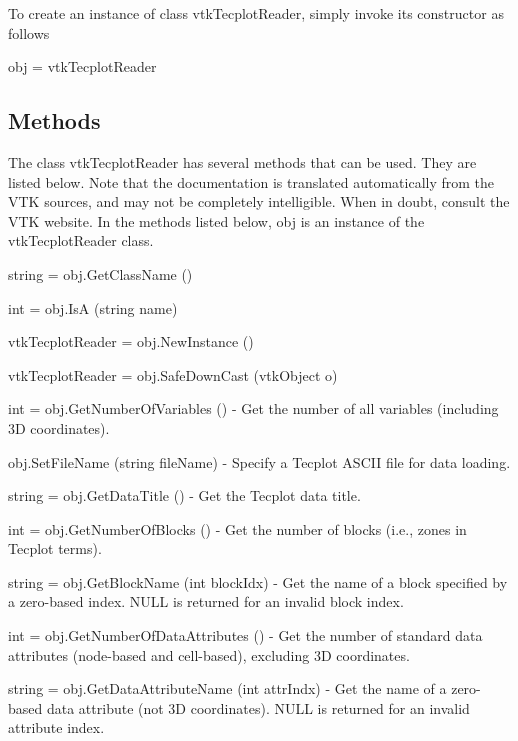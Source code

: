 To create an instance of class vtk\-Tecplot\-Reader, simply invoke its constructor as follows \begin{DoxyVerb}  obj = vtkTecplotReader
\end{DoxyVerb}
 \hypertarget{vtkwidgets_vtkxyplotwidget_Methods}{}\subsection{Methods}\label{vtkwidgets_vtkxyplotwidget_Methods}
The class vtk\-Tecplot\-Reader has several methods that can be used. They are listed below. Note that the documentation is translated automatically from the V\-T\-K sources, and may not be completely intelligible. When in doubt, consult the V\-T\-K website. In the methods listed below, {\ttfamily obj} is an instance of the vtk\-Tecplot\-Reader class. 
\begin{DoxyItemize}
\item {\ttfamily string = obj.\-Get\-Class\-Name ()}  
\item {\ttfamily int = obj.\-Is\-A (string name)}  
\item {\ttfamily vtk\-Tecplot\-Reader = obj.\-New\-Instance ()}  
\item {\ttfamily vtk\-Tecplot\-Reader = obj.\-Safe\-Down\-Cast (vtk\-Object o)}  
\item {\ttfamily int = obj.\-Get\-Number\-Of\-Variables ()} -\/ Get the number of all variables (including 3\-D coordinates).  
\item {\ttfamily obj.\-Set\-File\-Name (string file\-Name)} -\/ Specify a Tecplot A\-S\-C\-I\-I file for data loading.  
\item {\ttfamily string = obj.\-Get\-Data\-Title ()} -\/ Get the Tecplot data title.  
\item {\ttfamily int = obj.\-Get\-Number\-Of\-Blocks ()} -\/ Get the number of blocks (i.\-e., zones in Tecplot terms).  
\item {\ttfamily string = obj.\-Get\-Block\-Name (int block\-Idx)} -\/ Get the name of a block specified by a zero-\/based index. N\-U\-L\-L is returned for an invalid block index.  
\item {\ttfamily int = obj.\-Get\-Number\-Of\-Data\-Attributes ()} -\/ Get the number of standard data attributes (node-\/based and cell-\/based), excluding 3\-D coordinates.  
\item {\ttfamily string = obj.\-Get\-Data\-Attribute\-Name (int attr\-Indx)} -\/ Get the name of a zero-\/based data attribute (not 3\-D coordinates). N\-U\-L\-L is returned for an invalid attribute index.  

\end{DoxyItemize}
